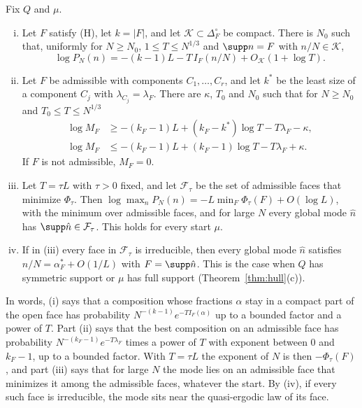 \begin{theorem}\label{thm:first}
Fix $Q$ and $\mu$.
\begin{enumerate}[(i)]
\item Let $F$ satisfy (H), let $k=\lvert F\rvert$, and let
$\mathcal K\subset\Delta_F^\circ$ be compact. There is $N_0$ such that,
uniformly for $N\ge N_0$, $1\le T\le N^{1/3}$ and $\supp n=F$ with
$n/N\in\mathcal K$,
\[
 \log P_N(n)=-(k-1)L-T\,I_F(n/N)+O_{\mathcal K}(1+\log T).
\]
\item Let $F$ be admissible with components $C_1,\dots,C_r$, and let $k^*$ be
the least size of a component $C_j$ with $\lambda_{C_j}=\lambda_F$. There are
$\kappa$, $T_0$ and $N_0$ such that for $N\ge N_0$ and $T_0\le T\le N^{1/3}$
\begin{align*}
 \log M_F&\ge-(k_F-1)L+(k_F-k^*)\log T-T\lambda_F-\kappa,\\
 \log M_F&\le-(k_F-1)L+(k_F-1)\log T-T\lambda_F+\kappa.
\end{align*}
If $F$ is not admissible, $M_F=0$.
\item Let $T=\tau L$ with $\tau>0$ fixed, and let $\mathcal F_\tau$ be the set
of admissible faces that minimize $\Phi_\tau$. Then
$\log\max_nP_N(n)=-L\min_F\Phi_\tau(F)+O(\log L)$, with the minimum over
admissible faces, and for large $N$ every global mode $\hat n$ has
$\supp\hat n\in\mathcal F_\tau$. This holds for every start $\mu$.
\item If in (iii) every face in $\mathcal F_\tau$ is irreducible, then every
global mode $\hat n$ satisfies $\hat n/N=\alpha^*_F+O(1/L)$ with
$F=\supp\hat n$. This is the case when $Q$ has symmetric support or $\mu$ has
full support (Theorem~\ref{thm:hull}(c)).
\end{enumerate}
\end{theorem}

In words, (i) says that a composition whose fractions $\alpha$ stay in a compact part of the
open face has probability $N^{-(k-1)}e^{-TI_F(\alpha)}$ up to a bounded factor and a power of
$T$. Part (ii) says
that the best composition on an admissible face has probability
$N^{-(k_F-1)}e^{-T\lambda_F}$ times a power of $T$ with exponent between $0$
and $k_F-1$, up to a bounded factor. With $T=\tau L$ the exponent of $N$ is then
$-\Phi_\tau(F)$, and part (iii) says that for large $N$ the mode lies on an admissible face that minimizes it among the admissible faces, whatever the start.
By (iv), if every such face is irreducible, the mode sits near the quasi-ergodic law of its
face.

